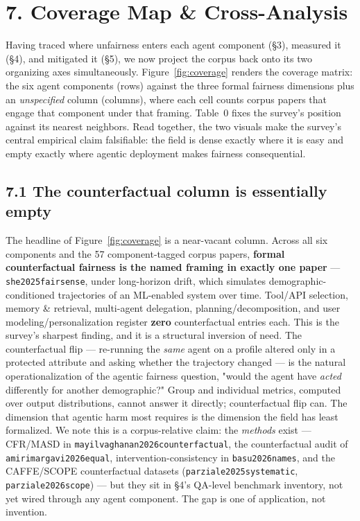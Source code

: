 \documentclass[sigconf,nonacm]{acmart}
\begin{document}
\section{7. Coverage Map & Cross-Analysis}

Having traced where unfairness enters each agent component (§3), measured it (§4), and mitigated it (§5), we now project the corpus back onto its two organizing axes simultaneously. Figure~\ref{fig:coverage} renders the coverage matrix: the six agent components (rows) against the three formal fairness dimensions plus an \emph{unspecified} column (columns), where each cell counts corpus papers that engage that component under that framing. Table~0 fixes the survey's position against its nearest neighbors. Read together, the two visuals make the survey's central empirical claim falsifiable: the field is dense exactly where it is easy and empty exactly where agentic deployment makes fairness consequential.

\subsection{7.1 The counterfactual column is essentially empty}

The headline of Figure~\ref{fig:coverage} is a near-vacant column. Across all six components and the 57 component-tagged corpus papers, \textbf{formal counterfactual fairness is the named framing in exactly one paper} — \texttt{she2025fairsense}, under long-horizon drift, which simulates demographic-conditioned trajectories of an ML-enabled system over time. Tool/API selection, memory \& retrieval, multi-agent delegation, planning/decomposition, and user modeling/personalization register \textbf{zero} counterfactual entries each. This is the survey's sharpest finding, and it is a structural inversion of need. The counterfactual flip — re-running the \emph{same} agent on a profile altered only in a protected attribute and asking whether the trajectory changed — is the natural operationalization of the agentic fairness question, "would the agent have \emph{acted} differently for another demographic?" Group and individual metrics, computed over output distributions, cannot answer it directly; counterfactual flip can. The dimension that agentic harm most requires is the dimension the field has least formalized. We note this is a corpus-relative claim: the \emph{methods} exist — CFR/MASD in \texttt{mayilvaghanan2026counterfactual}, the counterfactual audit of \texttt{amirimargavi2026equal}, intervention-consistency in \texttt{basu2026names}, and the CAFFE/SCOPE counterfactual datasets (\texttt{parziale2025systematic}, \texttt{parziale2026scope}) — but they sit in §4's QA-level benchmark inventory, not yet wired through any agent component. The gap is one of application, not invention.
\end{document}
